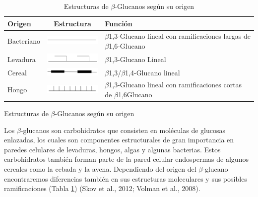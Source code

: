 \documentclass[12pt,a4paper,oneside]{scrbook}
\begin{document}
\begin{table}[h!]
    \sffamily
    \begin{center}
        \begin{threeparttable}
        \caption{Estructuras de $\beta$-Glucanos según su origen}\label{tablaglucanos}
            \begin{tabularx}{13cm}{l c X}
            \toprule
            \textbf{Origen} & \textbf{Estructura} & \textbf{Función} \\
            \midrule
            Bacteriano & \includegraphics[width=3cm]{bgbacteriano} & $\beta$1,3-Glucano lineal con ramificaciones largas de $\beta$1,6-Glucano\\
            Levadura & \includegraphics[width=3cm]{bglevadura} & $\beta$1,3-Glucano Lineal \\ 
            Cereal & \includegraphics[width=3cm]{bgcereal} & $\beta$1,3/$\beta$1,4-Glucano lineal \\
            Hongo & \includegraphics[width=3cm]{bghongo} & $\beta$1,3-Glucano lineal con ramificaciones cortas de $\beta$1,6Glucano \\
            \bottomrule
            \end{tabularx}
            \begin{tablenotes}
            \item Estructuras de $\beta$-Glucanos según su origen
            \end{tablenotes}
        \end{threeparttable}
    \end{center}
\end{table}

Los $\beta$-glucanos son carbohidratos que consisten en moléculas de
glucosas enlazadas, los cuales son componentes estructurales de gran
importancia en paredes celulares de levaduras, hongos, algas y algunas
bacterias. Estos carbohidratos también forman parte de la pared celular
endospermas de algunos cereales como la cebada y la avena. Dependiendo
del origen del $\beta$-glucano encontraremos diferencias también en sus
estructuras moleculares y sus posibles ramificaciones (Tabla
\ref{tablaglucanos}) (Skov et al., 2012; Volman et al., 2008).
\end{document}
